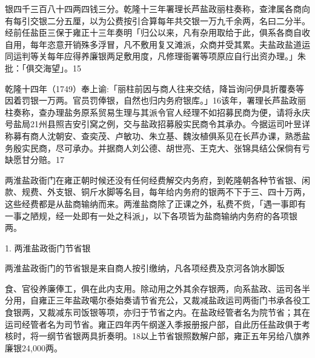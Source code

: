 \noindent 银四千三百八十四两四钱三分。乾隆十三年署理长芦盐政丽柱奏称，查津属各商向有每引交银二分五厘，以为公费按引合算每年共交银一万九千余两，名曰二分半。经前任盐臣三保于雍正十三年奏明「归公以来，凡有杂用取给于此，俱系各商自收自用，每年恣意开销殊多浮冒，凡不敷用复又滩派，众商并受其累。夫盐政盐道运同运判等关每年应得养廉银两足敷用度，凡修理衙署等项原应自行出资办理。」朱批：「俱交海望」。15

乾隆十四年（1749）奉上谕:「丽柱前因与商人往来交结，降旨询问伊具折覆奏等因着罚银一万两。官员罚俸银，自然也归内务府银库。」16该年，署理长芦盐政丽柱奏称，查办理盐务原系贸易生理与其派令官人经理不如招募民商为便，请将永庆号盐局21州县照吉安引窝之例，交与盐政招募殷实民商令其承办。今据运司叶昱详称募有商人沈朝安、查奕茂、卢敏功、朱立基、魏汝植俱系见在长芦办课，熟悉盐务殷实民商，尽可承办。并据商人刘公德、胡世亮、王克大、张锦具结公保倘有亏缺愿甘分赔。17


两淮盐政衙门在雍正朝时候还没有任何经费解交内务府，到乾隆朝各种节省银、闲款、规费、外支银、铜斤水脚等名目，每年给内务府的银两不下于三、四十万两，这些经费都是从盐商输纳而来。两淮盐商除了正课之外，私费不赀，「遇一事即有一事之陋规，经一处即有一处之科派」，以下各项皆为盐商输纳内务府的各项银两。

1. 两淮盐政衙门节省银

两淮盐政衙门的节省银是来自商人按引缴纳，凡各项经费及京河各饷水脚饭

\vfill
\begin{BookNotes}
\end{BookNotes}

\noindent 食、官役养廉俸工，俱在此内支用。除动用之外其余存银两，向系盐政、运司各半分用，自雍正三年盐政噶尔泰始奏请节省充公，又裁减盐政运司两衙门书承各役工食银两，又裁减东司饭银等项，亦归于节省之内。在盐政经管者名为院节省；其在运司经管者名为司节省。雍正四年丙午纲遂入季报册报户部，自此历任盐政俱于考核时，将一纲节省银两具折奏明。18以上节省银照数解户部，雍正五年另给八旗养廉银24,000两。

